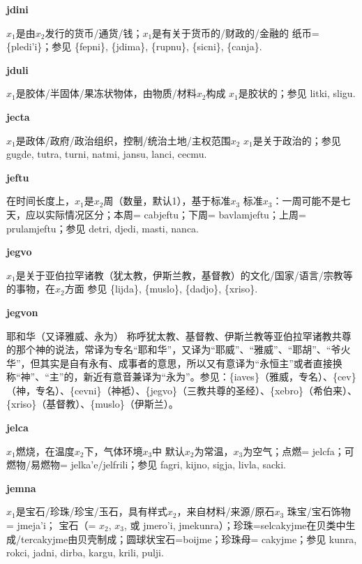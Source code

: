 \documentclass[notitlepage,twocolumn,a4paper,10pt]{book}
\begin{document}
{\sffamily\bfseries jdini}\enspace {\ttfamily\bfseries[din     di'i]}  $x_1$是由$x_2$发行的货币\slash{}通货\slash{}钱；$x_1$是有关于货币的\slash{}财政的\slash{}金融的 \textemdash{} 纸币= \{pledi'i\}；参见 \{fepni\}, \{jdima\}, \{rupnu\}, \{sicni\}, \{canja\}.

{\sffamily\bfseries jduli}  $x_1$是胶体\slash{}半固体\slash{}果冻状物体，由物质\slash{}材料$x_2$构成 \textemdash{} $x_1$是胶状的；参见 {litki}, {sligu}.

{\sffamily\bfseries jecta}\enspace {\ttfamily\bfseries[jec     je'a]}  $x_1$是政体\slash{}政府\slash{}政治组织，控制\slash{}统治土地\slash{}主权范围$x_2$ \textemdash{} $x_1$是关于政治的；参见 {gugde}, {tutra}, {turni}, {natmi}, {jansu}, {lanci}, {cecmu}.

{\sffamily\bfseries jeftu}\enspace {\ttfamily\bfseries[jef]}  在时间长度上，$x_1$是$x_2$周（数量，默认1），基于标准$x_3$ \textemdash{} 标准$x_3$：一周可能不是七天，应以实际情况区分；本周= {cabjeftu}；下周= {bavlamjeftu}；上周= {prulamjeftu}；参见 {detri}, {djedi}, {masti}, {nanca}.

{\sffamily\bfseries jegvo}\enspace {\ttfamily\bfseries[jeg     je'o]}  $x_1$是关于亚伯拉罕诸教（犹太教，伊斯兰教，基督教）的文化\slash{}国家\slash{}语言\slash{}宗教等的事物，在$x_2$方面 \textemdash{} 参见 \{lijda\}, \{muslo\}, \{dadjo\}, \{xriso\}.

{\sffamily\bfseries jegvon} 耶和华（又译雅威、永为） \textemdash{} 称呼犹太教、基督教、伊斯兰教等亚伯拉罕诸教共尊的那个神的说法，常译为专名“耶和华”，又译为“耶威”、“雅威”、“耶胡”、“爷火华”，但其实是自有永有、成事者的意思，所以又有意译为“永恒主”或者直接换称“神”、“主”的，新近有意音兼译为“永为”。参见：\{iaves\}（雅威，专名）、\{cev\}（神，专名）、\{cevni\}（神袛）、\{jegvo\}（三教共尊的圣经）、\{xebro\}（希伯来）、\{xriso\}（基督教）、\{muslo\}（伊斯兰）。

{\sffamily\bfseries jelca}\enspace {\ttfamily\bfseries[jel]}  $x_1$燃烧，在温度$x_2$下，气体环境$x_3$中 \textemdash{} 默认$x_2$为常温，$x_3$为空气；点燃= {jelcfa}；可燃物\slash{}易燃物= {jelka'e}\slash{}{jelfrili}；参见 {fagri}, {kijno}, {sigja}, {livla}, {sacki}.

{\sffamily\bfseries jemna}\enspace {\ttfamily\bfseries[    jme]}  $x_1$是宝石\slash{}珍珠\slash{}珍宝\slash{}玉石，具有样式$x_2$，来自材料\slash{}来源\slash{}原石$x_3$ \textemdash{} 珠宝\slash{}宝石饰物= {jmeja'i}； 宝石（= $x_2$, $x_3$, 或 {jmero'i}, {jmekunra}）；珍珠={selcakyjme}在贝类中生成\slash{}{tercakyjme}由贝壳制成；圆球状宝石={boijme}；珍珠母= {cakyjme}；参见 {kunra}, {rokci}, {jadni}, {dirba}, {kargu}, {krili}, {pulji}.
\end{document}
